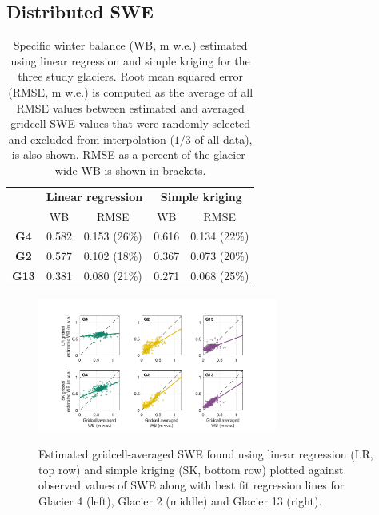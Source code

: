 \documentclass[twocolumn, letterpaper]{igs}
\begin{document}
\subsection{Distributed SWE}
 
 \begin{table}[]
\centering
\caption{Specific winter balance (WB, m w.e.) estimated using linear regression and simple kriging for the three study glaciers. Root mean squared error (RMSE, m w.e.) is computed as the average of all RMSE values between estimated and averaged gridcell SWE values that were randomly selected and excluded from interpolation ($1/3$ of all data), is also shown. RMSE as a percent of the glacier-wide WB is shown in brackets.}
\label{tab:WSMB&RMSE}
\begin{tabular}{c|cc|cc}
 & \multicolumn{2}{c|}{\textbf{Linear regression}} & \multicolumn{2}{c}{\textbf{Simple kriging}} \\
 & WB & RMSE & WB & RMSE \\ \hline
\textbf{G4} & 0.582 & 0.153 (26\%) & 0.616 & 0.134 (22\%) \\
\textbf{G2} & 0.577 & 0.102 (18\%) & 0.367 & 0.073 (20\%) \\
\textbf{G13} & 0.381 & 0.080 (21\%) & 0.271 & 0.068 (25\%)
\end{tabular}
\end{table}

\begin{figure}
	\centering
	\includegraphics[width =0.7\textwidth]{observedVSestimated_S2.pdf}\\
	\caption{Estimated gridcell-averaged SWE found using linear regression (LR, top row) and simple kriging (SK, bottom row) plotted against observed values of SWE along with best fit regression lines for Glacier 4 (left), Glacier 2 (middle) and Glacier 13 (right).}
	\label{fig:observedVSestimated_S2}
\end{figure}
\end{document}
